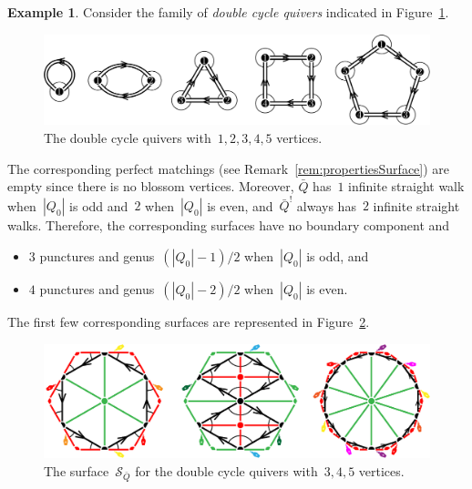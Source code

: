 \documentclass{amsart}
\theoremstyle{definition}
\newtheorem{example}[theorem]{Example}
\newcommand{\fref}[1]{Figure~\ref{#1}} %
\newcommand{\darkblue}{\color{darkblue}} %
\newcommand{\defn}[1]{\textsl{\darkblue #1}} %
\newcommand{\surface}{\mathcal{S}} %
\newcommand{\koszul}{^!} %
\begin{document}
\begin{example}
\label{exm:doubleCycle}
Consider the family of \defn{double cycle quivers} indicated in \fref{fig:doubleCyclesQuivers}.

\begin{figure}[h]
	\capstart
	\centerline{\includegraphics[scale=.45]{doubleCyclesQuivers}}
	\caption{The double cycle quivers with~$1, 2, 3, 4, 5$ vertices.}
	\label{fig:doubleCyclesQuivers}
\end{figure}

The corresponding perfect matchings (see Remark~\ref{rem:propertiesSurface}) are empty since there is no blossom vertices.
Moreover, $\bar Q$ has~$1$ infinite straight walk when~$|Q_0|$ is odd and~$2$ when~$|Q_0|$ is even, and~$\bar Q\koszul$ always has~$2$ infinite straight walks.
Therefore, the corresponding surfaces have no boundary component and
\begin{itemize}
\item $3$ punctures and genus~$(|Q_0|-1)/2$ when~$|Q_0|$ is odd, and 
\item $4$ punctures and genus~$(|Q_0|-2)/2$ when~$|Q_0|$ is even.
\end{itemize}
The first few corresponding surfaces are represented in \fref{fig:doubleCyclesSurfaces}.

\begin{figure}[h]
	\capstart
	\centerline{\includegraphics[scale=.7]{doubleCyclesSurfaces}}
	\caption{The surface~$\surface_{\bar Q}$ for the double cycle quivers with~$3, 4, 5$ vertices.}
	\label{fig:doubleCyclesSurfaces}
\end{figure}

\end{example}
\end{document}
